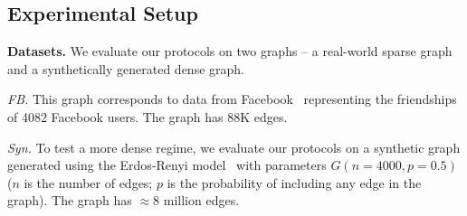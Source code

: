     \subsection{Experimental Setup}\label{chap4-sec:exp-setup}

\noindent\textbf{Datasets.} We evaluate our protocols on two graphs -- a real-world sparse graph and a synthetically generated dense graph.
\squishlist
    \item \textit{FB.} This graph  corresponds to data from Facebook~\cite{FB} representing the friendships of 4082 Facebook users. The graph has $88$K edges. %
    \item \textit{Syn.} To test a more dense regime, we evaluate our protocols on a synthetic graph generated using the Erdos-Renyi model~\cite{ER} with parameters $G(n=4000, p=0.5)$ ($n$ is the number of edges; $p$ is the probability of including any edge in the graph).  The graph has $\approx 8$ million edges. %
\squishend

